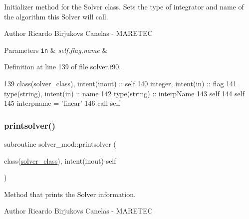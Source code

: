 Initializer method for the Solver class. Sets the type of integrator and name of the algorithm this Solver will call. 

\begin{DoxyAuthor}{Author}
Ricardo Birjukovs Canelas -\/ M\+A\+R\+E\+T\+EC 
\end{DoxyAuthor}

\begin{DoxyParams}[1]{Parameters}
\mbox{\tt in}  & {\em self,flag,name} & \\
\hline
\end{DoxyParams}


Definition at line 139 of file solver.\+f90.


\begin{DoxyCode}
139     \textcolor{keywordtype}{class}(solver\_class), \textcolor{keywordtype}{intent(inout)} :: self
140     \textcolor{keywordtype}{integer}, \textcolor{keywordtype}{intent(in)} :: flag
141     \textcolor{keywordtype}{type}(string), \textcolor{keywordtype}{intent(in)} :: name
142     \textcolor{keywordtype}{type}(string) :: interpName
143     self%
144     self%
145     interpname = \textcolor{stringliteral}{'linear'}
146     \textcolor{keyword}{call }self%
\end{DoxyCode}
\mbox{\label{namespacesolver__mod_a54ea6899cce026a7a5da2dd05922628f}} 
\subsubsection{\texorpdfstring{printsolver()}{printsolver()}}
{\footnotesize\ttfamily subroutine solver\+\_\+mod\+::printsolver (\begin{DoxyParamCaption}\item[{class(\mbox{\hyperlink{structsolver__mod_1_1solver__class}{solver\+\_\+class}}), intent(inout)}]{self }\end{DoxyParamCaption})\hspace{0.3cm}{\ttfamily [private]}}



Method that prints the Solver information. 

\begin{DoxyAuthor}{Author}
Ricardo Birjukovs Canelas -\/ M\+A\+R\+E\+T\+EC 
\end{DoxyAuthor}


